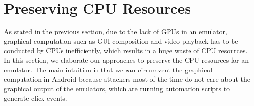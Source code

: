 \documentclass[conference]{IEEEtranl}
\begin{document}



	\section{Preserving CPU Resources}\label{Circuvment}
	As stated in the previous section, due to the lack of GPUs in an emulator, graphical computation such as GUI composition and video playback has to be conducted by CPUs inefficiently, which results in a huge waste of CPU resources. In this section, we elaborate our approaches to preserve the CPU resources for an emulator. The main intuition is that we can circumvent the graphical computation in Android because attackers most of the time do not care about the graphical output of the emulators, which are running automation scripts to generate click events.
\end{document}
